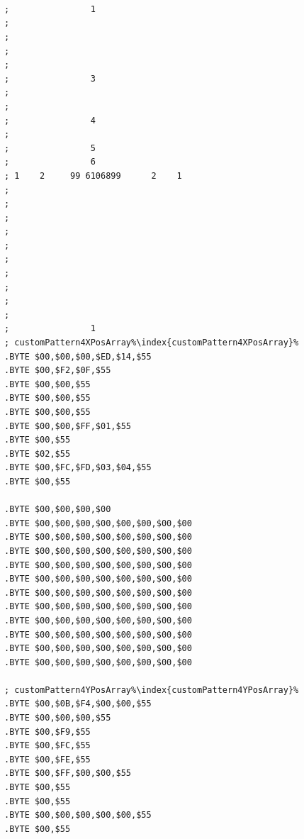 \begin{minipage}[b]{0.33\linewidth}
\begin{lrbox}{\mybox}%
\begin{lstlisting}[basicstyle=\ttfamily\tiny,escapechar=\%]



;                1                    
;                                     
;                                     
;                                     
;                                     
;                3                    
;                                     
;                                     
;                4                    
;                                     
;                5                    
;                6                    
; 1    2     99 6106899      2    1
;                                     
;                                     
;                                     
;                                     
;                                     
;                                     
;                                     
;                                     
;                                     
;                                     
;                1                    
; customPattern4XPosArray%\index{customPattern4XPosArray}%
.BYTE $00,$00,$00,$ED,$14,$55
.BYTE $00,$F2,$0F,$55
.BYTE $00,$00,$55
.BYTE $00,$00,$55
.BYTE $00,$00,$55
.BYTE $00,$00,$FF,$01,$55
.BYTE $00,$55
.BYTE $02,$55
.BYTE $00,$FC,$FD,$03,$04,$55
.BYTE $00,$55

.BYTE $00,$00,$00,$00
.BYTE $00,$00,$00,$00,$00,$00,$00,$00
.BYTE $00,$00,$00,$00,$00,$00,$00,$00
.BYTE $00,$00,$00,$00,$00,$00,$00,$00
.BYTE $00,$00,$00,$00,$00,$00,$00,$00
.BYTE $00,$00,$00,$00,$00,$00,$00,$00
.BYTE $00,$00,$00,$00,$00,$00,$00,$00
.BYTE $00,$00,$00,$00,$00,$00,$00,$00
.BYTE $00,$00,$00,$00,$00,$00,$00,$00
.BYTE $00,$00,$00,$00,$00,$00,$00,$00
.BYTE $00,$00,$00,$00,$00,$00,$00,$00
.BYTE $00,$00,$00,$00,$00,$00,$00,$00

; customPattern4YPosArray%\index{customPattern4YPosArray}%
.BYTE $00,$0B,$F4,$00,$00,$55
.BYTE $00,$00,$00,$55
.BYTE $00,$F9,$55
.BYTE $00,$FC,$55
.BYTE $00,$FE,$55
.BYTE $00,$FF,$00,$00,$55
.BYTE $00,$55
.BYTE $00,$55
.BYTE $00,$00,$00,$00,$00,$55
.BYTE $00,$55


\end{lstlisting}
\end{lrbox}
\end{minipage}
